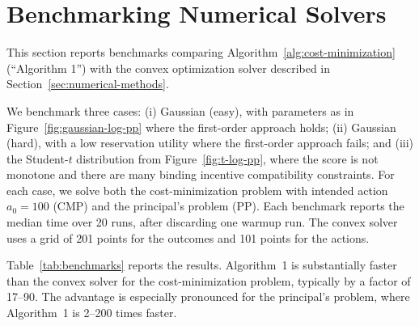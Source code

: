 \documentclass[12pt]{article}
\begin{document}
\begin{table}[ht]
\centering
\captionsetup{font=footnotesize}
\caption{One-at-a-time variations on the Gaussian baseline.}
\label{tab:foa-gaussian-variations}
\small
{}
\end{table}


\section{Benchmarking Numerical Solvers}
\label{sec:benchmarks}

This section reports benchmarks comparing Algorithm~\ref{alg:cost-minimization} (``Algorithm 1'') with the convex optimization solver described in Section~\ref{sec:numerical-methods}. 

We benchmark three cases: (i) Gaussian (easy), with parameters as in Figure~\ref{fig:gaussian-log-pp} where the first-order approach holds; (ii) Gaussian (hard), with a low reservation utility where the first-order approach fails; and (iii) the Student-$t$ distribution from Figure~\ref{fig:t-log-pp}, where the score is not monotone and there are many binding incentive compatibility constraints. For each case, we solve both the cost-minimization problem with intended action $a_0=100$ (CMP) and the principal's problem (PP). Each benchmark reports the median time over 20 runs, after discarding one warmup run. The convex solver uses a grid of 201 points for the outcomes and 101 points for the actions.

Table~\ref{tab:benchmarks} reports the results. Algorithm~1 is substantially faster than the convex solver for the cost-minimization problem, typically by a factor of 17--90. The advantage is especially pronounced for the principal's problem, where Algorithm~1 is 2--200 times faster.

\begin{table}[h]
    \centering
    \captionsetup{font=footnotesize}
    \caption{Benchmark results: median runtime in milliseconds.}
    \label{tab:benchmarks}
    
    \caption*{\textit{Note:} CMP = cost-minimization problem. PP = principal's problem. Each benchmark is the median of 20 runs. ``k'' denotes thousands of milliseconds.}
\end{table}
\end{document}

